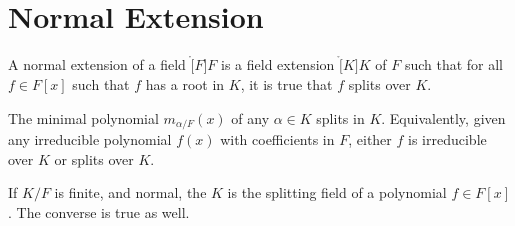 \documentclass{article}                                                        %
\begin{document}
    \section{Normal Extension}
        \begin{definition}
            A normal extension of a field $\ring[F]{F}$ is a field extension
            $\ring[K]{K}$ of $F$ such that for all $f\in{F}[x]$ such that $f$
            has a root in $K$, it is true that $f$ splits over $K$.
        \end{definition}
        \begin{theorem}
            The minimal polynomial $m_{\alpha/F}(x)$ of any $\alpha\in{K}$
            splits in $K$. Equivalently, given any irreducible polynomial
            $f(x)$ with coefficients in $F$, either $f$ is irreducible over $K$
            or splits over $K$.
        \end{theorem}
        \begin{theorem}
            If $K/F$ is finite, and normal, the $K$ is the splitting field of
            a polynomial $f\in{F}[x]$. The converse is true as well.
        \end{theorem}
\end{document}
